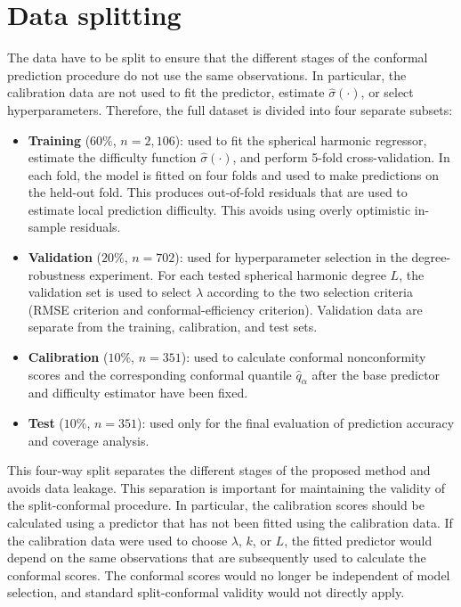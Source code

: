 \documentclass[11pt,a4paper]{report}
\begin{document}
\section{Data splitting}

The data have to be split to ensure that the different stages of the conformal prediction procedure do not use the same observations. In particular, the calibration data are not used to fit the predictor, estimate $\hat{\sigma}(\cdot)$, or select hyperparameters. Therefore, the full dataset is divided into four separate subsets:

\begin{itemize}
\item \textbf{Training} ($60\%$, $n=2{,}106$): used to fit the spherical harmonic regressor, estimate the difficulty function $\hat{\sigma}(\cdot)$, and perform 5-fold cross-validation. In each fold, the model is fitted on four folds and used to make predictions on the held-out fold. This produces out-of-fold residuals that are used to estimate local prediction difficulty. This avoids using overly optimistic in-sample residuals.

\item \textbf{Validation} ($20\%$, $n=702$): used for hyperparameter selection in the degree-robustness experiment. For each tested spherical harmonic degree $L$, the validation set is used to select $\lambda$ according to the two selection criteria (RMSE criterion and conformal-efficiency criterion). Validation data are separate from the training, calibration, and test sets. 

\item \textbf{Calibration} ($10\%$, $n=351$): used to calculate conformal nonconformity scores and the corresponding conformal quantile $\hat{q}_{\alpha}$ after the base predictor and difficulty estimator have been fixed.

\item \textbf{Test} ($10\%$, $n=351$): used only for the final evaluation of prediction accuracy and coverage analysis.

\end{itemize}
 
This four-way split separates the different stages of the proposed method and avoids data leakage. This separation is important for maintaining the validity of the split-conformal procedure. In particular, the calibration scores should be calculated using a predictor that has not been fitted using the calibration data. If the calibration data were used to choose $\lambda$, $k$, or $L$, the fitted predictor would depend on the same observations that are subsequently used to calculate the conformal scores. The conformal scores would no longer be independent of model selection, and standard split-conformal validity would not directly apply.
\end{document}
